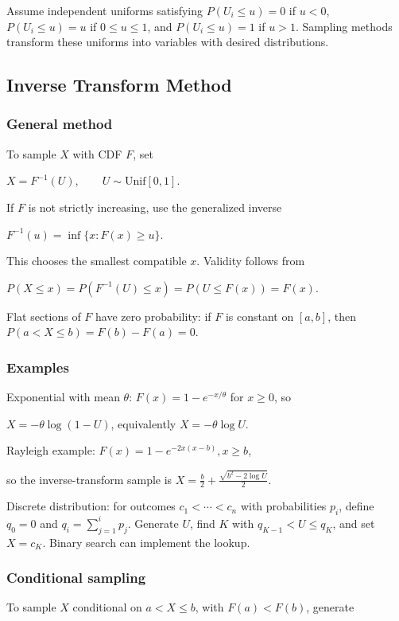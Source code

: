 Assume independent uniforms satisfying $P(U_i\le u)=0$ if $u<0$, $P(U_i\le u)=u$ if $0\le u\le1$, and $P(U_i\le u)=1$ if $u>1$. Sampling methods transform these uniforms into variables with desired distributions.

\subsection{Inverse Transform Method}

\subsubsection*{General method}

To sample $X$ with CDF $F$, set

$X=F^{-1}(U),\qquad U\sim\mathrm{Unif}[0,1]$.

If $F$ is not strictly increasing, use the generalized inverse

$F^{-1}(u)=\inf\{x:F(x)\ge u\}$.

This chooses the smallest compatible $x$. Validity follows from

$P(X\le x)=P(F^{-1}(U)\le x)=P(U\le F(x))=F(x)$.

Flat sections of $F$ have zero probability: if $F$ is constant on $[a,b]$, then $P(a<X\le b)=F(b)-F(a)=0$.

\subsubsection*{Examples}

Exponential with mean $\theta$: $F(x)=1-e^{-x/\theta}$ for $x\ge0$, so

$X=-\theta\log(1-U)$, equivalently $X=-\theta\log U$.

Rayleigh example:
$F(x)=1-e^{-2x(x-b)}, x\ge b$,

so the inverse-transform sample is
$X=\frac{b}{2}+\frac{\sqrt{b^2-2\log U}}{2}$.

Discrete distribution: for outcomes $c_1<\cdots<c_n$ with probabilities $p_i$, define $q_0=0$ and
$q_i=\sum_{j=1}^i p_j$.
Generate $U$, find $K$ with $q_{K-1}<U\le q_K$, and set $X=c_K$. Binary search can implement the lookup.

\subsubsection*{Conditional sampling}

To sample $X$ conditional on $a<X\le b$, with $F(a)<F(b)$, generate

